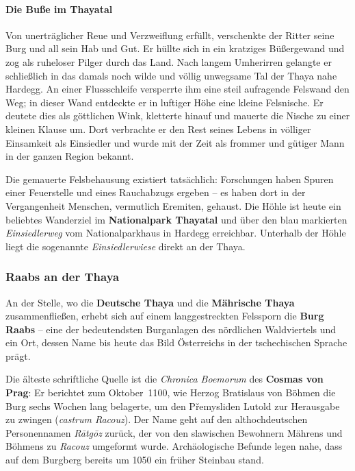 \paragraph*{Die Buße im Thayatal}

Von unerträglicher Reue und Verzweiflung erfüllt, verschenkte der Ritter seine Burg und all sein Hab und Gut. Er hüllte sich in ein kratziges Büßergewand und zog als ruheloser Pilger durch das Land. Nach langem Umherirren gelangte er schließlich in das damals noch wilde und völlig unwegsame Tal der Thaya nahe Hardegg. An einer Flussschleife versperrte ihm eine steil aufragende Felswand den Weg; in dieser Wand entdeckte er in luftiger Höhe eine kleine Felsnische. Er deutete dies als göttlichen Wink, kletterte hinauf und mauerte die Nische zu einer kleinen Klause um. Dort verbrachte er den Rest seines Lebens in völliger Einsamkeit als Einsiedler und wurde mit der Zeit als frommer und gütiger Mann in der ganzen Region bekannt.

Die gemauerte Felsbehausung existiert tatsächlich: Forschungen haben Spuren einer Feuerstelle und eines Rauchabzugs ergeben -- es haben dort in der Vergangenheit Menschen, vermutlich Eremiten, gehaust. Die Höhle ist heute ein beliebtes Wanderziel im \textbf{Nationalpark Thayatal} und über den blau markierten \textit{Einsiedlerweg} vom Nationalparkhaus in Hardegg erreichbar. Unterhalb der Höhle liegt die sogenannte \textit{Einsiedlerwiese} direkt an der Thaya. \cite{kacetl_thayatal}

\subsubsection{Raabs an der Thaya}\label{raabs}

An der Stelle, wo die \textbf{Deutsche Thaya} und die \textbf{Mährische Thaya} zusammenfließen, erhebt sich auf einem langgestreckten Felssporn die \textbf{Burg Raabs} -- eine der bedeutendsten Burganlagen des nördlichen Waldviertels und ein Ort, dessen Name bis heute das Bild Österreichs in der tschechischen Sprache prägt.

Die älteste schriftliche Quelle ist die \textit{Chronica Boemorum} des \textbf{Cosmas von Prag}: Er berichtet zum Oktober~1100, wie Herzog Bratislaus von Böhmen die Burg sechs Wochen lang belagerte, um den Přemysliden Lutold zur Herausgabe zu zwingen (\textit{castrum Racouz}). Der Name geht auf den althochdeutschen Personennamen \textit{Rātgōz} zurück, der von den slawischen Bewohnern Mährens und Böhmens zu \textit{Racouz} umgeformt wurde. Archäologische Befunde legen nahe, dass auf dem Burgberg bereits um 1050 ein früher Steinbau stand. \cite{hopf_raabs,noe_burgen_online_raabs,wiki_raabs}

